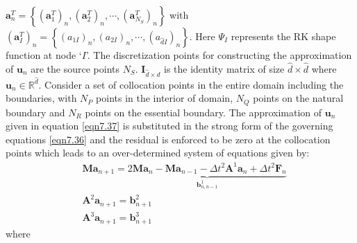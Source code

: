 \documentclass[10pt,letterpaper, onecolumn]{article}
\begin{document}
\noindent
$\bm{a}^T_n = \left\{ (\bm{a}_1^T)_n, (\bm{a}_2^T)_n, \cdots, (\bm{a}_{N_S}^T)_n \right\}$ with $(\bm{a}_I^T)_n=\left\{ (a_{1I})_n, (a_{2I})_n, \cdots, (a_{\hat{d}I})_n \right\}$. Here $\Psi_I$ represents the RK shape function at node `$I$'. The discretization points for constructing the approximation of $\bm{u}_n$ are the source points $N_S$. $\bm{I}_{\hat{d} \times \hat{d}}$ is the identity matrix of size $\hat{d} \times \hat{d}$ where $\bm{u}_n \in \mathbb{R}^{\hat{d}}$. Consider a set of collocation points in the entire domain including the boundaries, with $N_P$ points in the interior of domain, $N_Q$ points on the natural boundary and $N_R$ points on the essential boundary. The approximation of $\bm{u}_n$ given in equation \eqref{eqn7.37} is substituted in the strong form of the governing equations \eqref{eqn7.36} and the residual is enforced to be zero at the collocation points which leads to an over-determined system of equations given by: 
%
\begin{subequations}
\begin{align}
&\bm{M} \bm{a}_{n+1} = \underbrace{2\bm{M} \bm{a}_{n} - \bm{M} \bm{a}_{n-1} - \Delta t^2 \bm{A}^1 \bm{a}_n + \Delta t^2 \bm{F}_n }_{\bm{b}^1_{n,n-1}} \\
& \bm{A}^2 \bm{a}_{n+1} = \bm{b}^2_{n+1} \\
&\bm{A}^3 \bm{a}_{n+1} = \bm{b}^3_{n+1}
\end{align}
\label{eqn.7.38dd}
\end{subequations}
%
where
%
\end{document}

